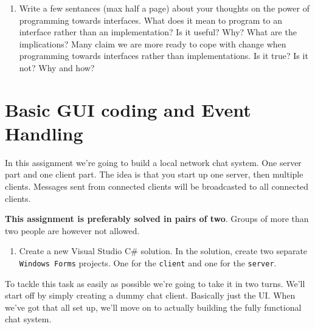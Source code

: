\documentclass{article}
\newcounter{stepcounter}
\newenvironment{steps}{ 
  \begin{enumerate}[label=\color{red}Step \thesection-\theenumi)]
    \setcounter{enumi}{\value{stepcounter}}
}{
  \setcounter{stepcounter}{\value{enumi}}
  \end{enumerate}
}
\begin{document}
\begin{steps}
  \item Write a few sentances (max half a page) about your thoughts on the power of programming towards interfaces. What does it mean to program to an interface rather than an implementation? Is it useful? Why? What are the implications? Many claim we are more ready to cope with change when programming towards interfaces rather than implementations. Is it true? Is it not? Why and how?
\end{steps}











\setcounter{stepcounter}{0}
\pagebreak
\section{Basic GUI coding and Event Handling}
In this assignment we're going to build a local network chat system. One server part and one client part. The idea is that you start up one server, then multiple clients. Messages sent from connected clients will be broadcasted to all connected clients.

\textbf{This assignment is preferably solved in pairs of two}. Groups of more than two people are however not allowed.
\begin{steps}
\item Create a new Visual Studio C\# solution. In the solution, create two separate \texttt{Windows Forms} projects. One for the \texttt{client} and one for the \texttt{server}.
\end{steps}
To tackle this task as easily as possible we're going to take it in two turns. We'll start off by simply creating a dummy chat client. Basically just the UI. When we've got that all set up, we'll move on to actually building the fully functional chat system.
\end{document}
